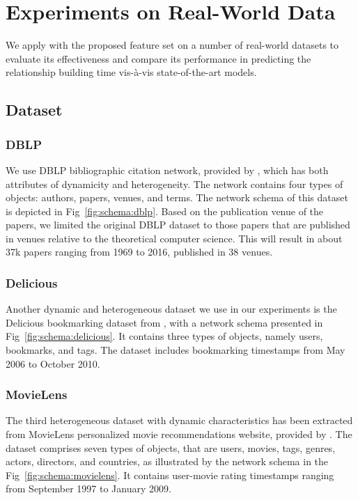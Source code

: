 \section{Experiments on Real-World Data}\label{sec:results}

We apply \npglm with the proposed feature set on a number of real-world datasets to evaluate its effectiveness and compare its performance in predicting the relationship building time vis-\`a-vis state-of-the-art models. 

\subsection{Dataset}
\subsubsection{DBLP}
We use DBLP bibliographic citation network, provided by \cite{tang2008aminer}, which has both attributes of dynamicity and heterogeneity. The network contains four types of objects: authors, papers, venues, and terms. The network schema of this dataset is depicted in Fig~\ref{fig:schema:dblp}. Based on the publication venue of the papers, we limited the original DBLP dataset to those papers that are published in venues relative to the theoretical computer science. This will result in about 37k papers ranging from 1969 to 2016, published in 38 venues.


\subsubsection{Delicious}
Another dynamic and heterogeneous dataset we use in our experiments is the Delicious bookmarking dataset from \cite{Cantador:RecSys2011}, with a network schema presented in Fig~\ref{fig:schema:delicious}. It contains three types of objects, namely users, bookmarks, and tags. The dataset includes bookmarking timestamps from May 2006 to October 2010. 

\subsubsection{MovieLens}
The third heterogeneous dataset with dynamic characteristics has been extracted from MovieLens personalized movie recommendations website, provided by \cite{harper2015}. The dataset comprises seven types of objects, that are users, movies, tags, genres, actors, directors, and countries, as illustrated by the network schema in the Fig~\ref{fig:schema:movielens}. It contains user-movie rating timestamps ranging from September 1997 to January 2009.


